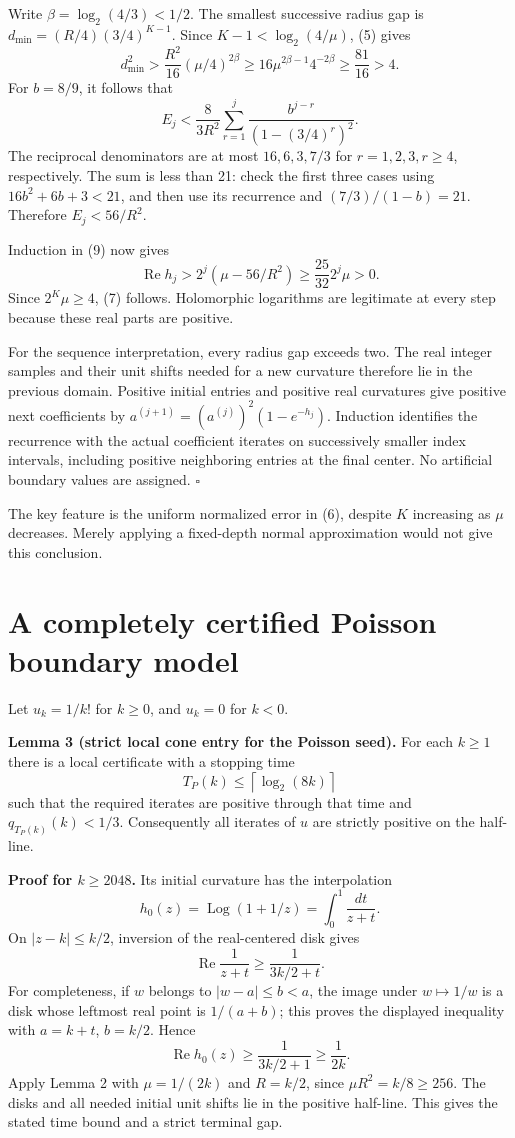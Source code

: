 \documentclass[11pt,a4paper]{article}
\begin{document}
Write \(\beta=\log_2(4/3)<1/2\). The smallest successive radius gap is
\(d_{\min}=(R/4)(3/4)^{K-1}\). Since \(K-1<\log_2(4/\mu)\), (5) gives \[
 d_{\min}^2>
 \frac{R^2}{16}(\mu/4)^{2\beta}
 \geq16\mu^{2\beta-1}4^{-2\beta}
 \geq\frac{81}{16}>4. \tag{10}
\] For \(b=8/9\), it follows that \[
 E_j<\frac{8}{3R^2}
 \sum_{r=1}^j\frac{b^{j-r}}{(1-(3/4)^r)^2}.
\] The reciprocal denominators are at most \(16,6,3,7/3\) for
\(r=1,2,3,r\geq4\), respectively. The sum is less than 21: check the
first three cases using \(16b^2+6b+3<21\), and then use its recurrence
and \((7/3)/(1-b)=21\). Therefore \(E_j<56/R^2\).

Induction in (9) now gives \[
 \operatorname{Re}h_j>
 2^j(\mu-56/R^2)\geq\frac{25}{32}2^j\mu>0.
\] Since \(2^K\mu\geq4\), (7) follows. Holomorphic logarithms are
legitimate at every step because these real parts are positive.

For the sequence interpretation, every radius gap exceeds two. The real
integer samples and their unit shifts needed for a new curvature
therefore lie in the previous domain. Positive initial entries and
positive real curvatures give positive next coefficients by
\(a^{(j+1)}=(a^{(j)})^2(1-e^{-h_j})\). Induction identifies the
recurrence with the actual coefficient iterates on successively smaller
index intervals, including positive neighboring entries at the final
center. No artificial boundary values are assigned. \(\square\)

The key feature is the uniform normalized error in (6), despite \(K\)
increasing as \(\mu\) decreases. Merely applying a fixed-depth normal
approximation would not give this conclusion.

\section{A completely certified Poisson boundary model}\label{a-completely-certified-poisson-boundary-model}


Let \(u_k=1/k!\) for \(k\geq0\), and \(u_k=0\) for \(k<0\).

\textbf{Lemma 3 (strict local cone entry for the Poisson seed).} For
each \(k\geq1\) there is a local certificate with a stopping time \[
 T_P(k)\leq\left\lceil\log_2(8k)\right\rceil
\] such that the required iterates are positive through that time and
\(q_{T_P(k)}(k)<1/3\). Consequently all iterates of \(u\) are strictly
positive on the half-line.

\textbf{Proof for \(k\geq2048\).} Its initial curvature has the
interpolation \[
 h_0(z)=\operatorname{Log}(1+1/z)=\int_0^1\frac{dt}{z+t}.
\] On \(|z-k|\leq k/2\), inversion of the real-centered disk gives \[
 \operatorname{Re}\frac1{z+t}\geq\frac1{3k/2+t}.
\] For completeness, if \(w\) belongs to \(|w-a|\leq b<a\), the image
under \(w\mapsto1/w\) is a disk whose leftmost real point is
\(1/(a+b)\); this proves the displayed inequality with \(a=k+t\),
\(b=k/2\). Hence \[
 \operatorname{Re}h_0(z)\geq\frac1{3k/2+1}\geq\frac1{2k}.
\] Apply Lemma 2 with \(\mu=1/(2k)\) and \(R=k/2\), since
\(\mu R^2=k/8\geq256\). The disks and all needed initial unit shifts lie
in the positive half-line. This gives the stated time bound and a strict
terminal gap.
\end{document}
